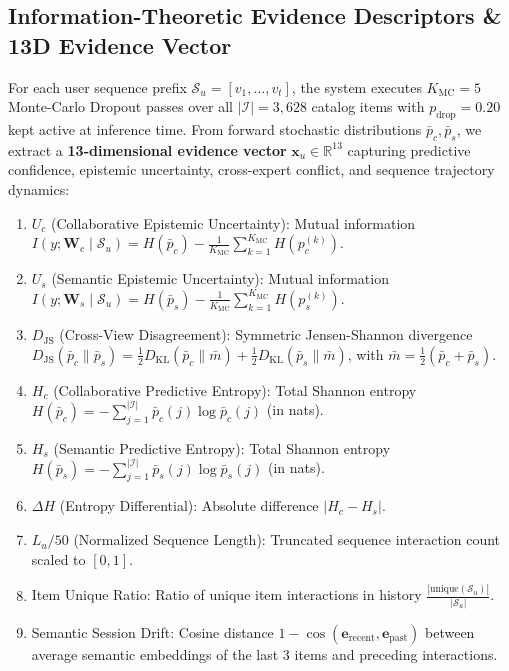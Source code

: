 \subsection{Information-Theoretic Evidence Descriptors \& 13D Evidence Vector}
\label{sec:evidence_features}

For each user sequence prefix $\mathcal{S}_u = [v_1, \dots, v_t]$, the system executes $K_{\text{MC}} = 5$ Monte-Carlo Dropout passes over all $|\mathcal{I}| = 3{,}628$ catalog items with $p_{\text{drop}} = 0.20$ kept active at inference time. From forward stochastic distributions $\bar{p}_c, \bar{p}_s$, we extract a \textbf{13-dimensional evidence vector} $\mathbf{x}_u \in \mathbb{R}^{13}$ capturing predictive confidence, epistemic uncertainty, cross-expert conflict, and sequence trajectory dynamics:
\begin{enumerate}[leftmargin=*]
    \item $U_c$ (Collaborative Epistemic Uncertainty): Mutual information $I(y; \mathbf{W}_c \mid \mathcal{S}_u) = H(\bar{p}_c) - \frac{1}{K_{\text{MC}}}\sum_{k=1}^{K_{\text{MC}}} H(p_c^{(k)})$.
    \item $U_s$ (Semantic Epistemic Uncertainty): Mutual information $I(y; \mathbf{W}_s \mid \mathcal{S}_u) = H(\bar{p}_s) - \frac{1}{K_{\text{MC}}}\sum_{k=1}^{K_{\text{MC}}} H(p_s^{(k)})$.
    \item $D_{\text{JS}}$ (Cross-View Disagreement): Symmetric Jensen-Shannon divergence $D_{\text{JS}}(\bar{p}_c \parallel \bar{p}_s) = \frac{1}{2} D_{\text{KL}}(\bar{p}_c \parallel \bar{m}) + \frac{1}{2} D_{\text{KL}}(\bar{p}_s \parallel \bar{m})$, with $\bar{m} = \frac{1}{2}(\bar{p}_c + \bar{p}_s)$.
    \item $H_c$ (Collaborative Predictive Entropy): Total Shannon entropy $H(\bar{p}_c) = -\sum_{j=1}^{|\mathcal{I}|} \bar{p}_c(j) \log \bar{p}_c(j)$ (in nats).
    \item $H_s$ (Semantic Predictive Entropy): Total Shannon entropy $H(\bar{p}_s) = -\sum_{j=1}^{|\mathcal{I}|} \bar{p}_s(j) \log \bar{p}_s(j)$ (in nats).
    \item $\Delta H$ (Entropy Differential): Absolute difference $|H_c - H_s|$.
    \item $L_u / 50$ (Normalized Sequence Length): Truncated sequence interaction count scaled to $[0, 1]$.
    \item Item Unique Ratio: Ratio of unique item interactions in history $\frac{|\text{unique}(\mathcal{S}_u)|}{|\mathcal{S}_u|}$.
    \item Semantic Session Drift: Cosine distance $1 - \cos(\mathbf{e}_{\text{recent}}, \mathbf{e}_{\text{past}})$ between average semantic embeddings of the last 3 items and preceding interactions.

\end{enumerate}
